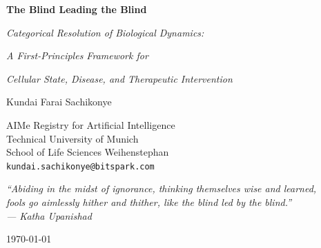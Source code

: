 
\begin{titlepage}
\centering
\vspace*{2.5cm}

{\Huge\bfseries The Blind Leading the Blind\par}

\vspace{1.2cm}

{\large\itshape Categorical Resolution of Biological Dynamics:\par}
{\large\itshape A First-Principles Framework for\par}
{\large\itshape Cellular State, Disease, and Therapeutic Intervention\par}

\vspace{3cm}

{\Large Kundai Farai Sachikonye\par}

\vspace{1cm}

{\normalsize
AIMe Registry for Artificial Intelligence\\
Technical University of Munich\\
School of Life Sciences Weihenstephan\\[0.5em]
\texttt{kundai.sachikonye@bitspark.com}
\par}

\vfill

\begin{center}
{\small\itshape
``Abiding in the midst of ignorance, thinking themselves wise and learned,\\
fools go aimlessly hither and thither, like the blind led by the blind.''\\
\upshape --- \textit{Katha Upanishad}
}
\end{center}

\vspace{1.5cm}

{\normalsize \today\par}

\end{titlepage}
